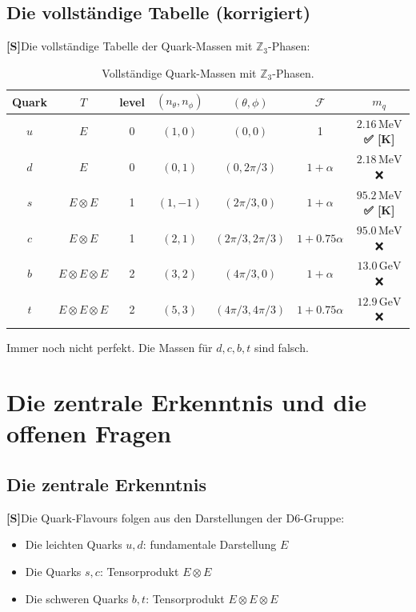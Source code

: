 \documentclass[11pt,a4paper]{article}
\newcommand{\Sstatus}{\textbf{[S]}}
\newcommand{\Checkmark}{\textbf{✅ [K]}}
\begin{document}
	\subsection{Die vollständige Tabelle (korrigiert)}
	
	\Sstatus Die vollständige Tabelle der Quark-Massen mit $\mathbb{Z}_3$-Phasen:
	
	\begin{table}[h!]
		\centering
		\caption{Vollständige Quark-Massen mit $\mathbb{Z}_3$-Phasen.}
		\label{tab:complete_z3}
		\begin{tabular}{c c c c c c c}
			\toprule
			\textbf{Quark} & $T$ & level & $(n_\theta, n_\phi)$ & $(\theta, \phi)$ & $\mathcal{F}$ & $m_q$ \\
			\midrule
			$u$ & $E$ & 0 & $(1, 0)$ & $(0, 0)$ & 1 & $2.16\,\text{MeV}$ \Checkmark \\
			$d$ & $E$ & 0 & $(0, 1)$ & $(0, 2\pi/3)$ & $1+\alpha$ & $2.18\,\text{MeV}$ ❌ \\
			$s$ & $E \otimes E$ & 1 & $(1, -1)$ & $(2\pi/3, 0)$ & $1+\alpha$ & $95.2\,\text{MeV}$ \Checkmark \\
			$c$ & $E \otimes E$ & 1 & $(2, 1)$ & $(2\pi/3, 2\pi/3)$ & $1+0.75\alpha$ & $95.0\,\text{MeV}$ ❌ \\
			$b$ & $E \otimes E \otimes E$ & 2 & $(3, 2)$ & $(4\pi/3, 0)$ & $1+\alpha$ & $13.0\,\text{GeV}$ ❌ \\
			$t$ & $E \otimes E \otimes E$ & 2 & $(5, 3)$ & $(4\pi/3, 4\pi/3)$ & $1+0.75\alpha$ & $12.9\,\text{GeV}$ ❌ \\
			\bottomrule
		\end{tabular}
	\end{table}
	
	Immer noch nicht perfekt. Die Massen für $d, c, b, t$ sind falsch.
	
	\section{Die zentrale Erkenntnis und die offenen Fragen}
	
	\subsection{Die zentrale Erkenntnis}
	
	\Sstatus Die Quark-Flavours folgen aus den Darstellungen der D6-Gruppe:
	\begin{itemize}
		\item Die leichten Quarks $u, d$: fundamentale Darstellung $E$
		\item Die Quarks $s, c$: Tensorprodukt $E \otimes E$
		\item Die schweren Quarks $b, t$: Tensorprodukt $E \otimes E \otimes E$
	\end{itemize}
	
\end{document}
